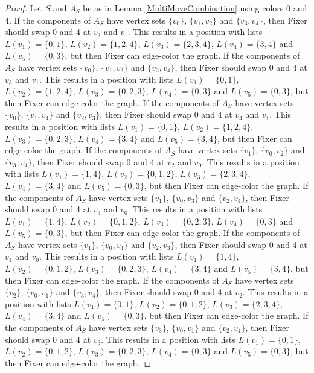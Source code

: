 \documentclass[12pt]{amsart}
\theoremstyle{plain}
\theoremstyle{definition}
\theoremstyle{remark}
\begin{document}
\begin{proof}
Let $S$ and $A_S$ be as in Lemma \ref{MultiMoveCombination} using colors $0$ and $4$. If the components of $A_S$ have vertex sets $\{v_0\}$, $\{v_1, v_2\}$ and $\{v_3, v_4\}$, then Fixer should swap 0 and 4 at $v_2$ and $v_1$. This results in a position with lists $L(v_1) = \{0, 1\}$, $L(v_2) = \{1, 2, 4\}$, $L(v_3) = \{2, 3, 4\}$, $L(v_4) = \{3, 4\}$ and $L(v_5) = \{0, 3\}$, but then Fixer can edge-color the graph.
If the components of $A_S$ have vertex sets $\{v_0\}$, $\{v_1, v_3\}$ and $\{v_2, v_4\}$, then Fixer should swap 0 and 4 at $v_3$ and $v_1$. This results in a position with lists $L(v_1) = \{0, 1\}$, $L(v_2) = \{1, 2, 4\}$, $L(v_3) = \{0, 2, 3\}$, $L(v_4) = \{0, 3\}$ and $L(v_5) = \{0, 3\}$, but then Fixer can edge-color the graph.
If the components of $A_S$ have vertex sets $\{v_0\}$, $\{v_1, v_4\}$ and $\{v_2, v_3\}$, then Fixer should swap 0 and 4 at $v_4$ and $v_1$. This results in a position with lists $L(v_1) = \{0, 1\}$, $L(v_2) = \{1, 2, 4\}$, $L(v_3) = \{0, 2, 3\}$, $L(v_4) = \{3, 4\}$ and $L(v_5) = \{3, 4\}$, but then Fixer can edge-color the graph.
If the components of $A_S$ have vertex sets $\{v_1\}$, $\{v_0, v_2\}$ and $\{v_3, v_4\}$, then Fixer should swap 0 and 4 at $v_2$ and $v_0$. This results in a position with lists $L(v_1) = \{1, 4\}$, $L(v_2) = \{0, 1, 2\}$, $L(v_3) = \{2, 3, 4\}$, $L(v_4) = \{3, 4\}$ and $L(v_5) = \{0, 3\}$, but then Fixer can edge-color the graph.
If the components of $A_S$ have vertex sets $\{v_1\}$, $\{v_0, v_3\}$ and $\{v_2, v_4\}$, then Fixer should swap 0 and 4 at $v_3$ and $v_0$. This results in a position with lists $L(v_1) = \{1, 4\}$, $L(v_2) = \{0, 1, 2\}$, $L(v_3) = \{0, 2, 3\}$, $L(v_4) = \{0, 3\}$ and $L(v_5) = \{0, 3\}$, but then Fixer can edge-color the graph.
If the components of $A_S$ have vertex sets $\{v_1\}$, $\{v_0, v_4\}$ and $\{v_2, v_3\}$, then Fixer should swap 0 and 4 at $v_4$ and $v_0$. This results in a position with lists $L(v_1) = \{1, 4\}$, $L(v_2) = \{0, 1, 2\}$, $L(v_3) = \{0, 2, 3\}$, $L(v_4) = \{3, 4\}$ and $L(v_5) = \{3, 4\}$, but then Fixer can edge-color the graph.
If the components of $A_S$ have vertex sets $\{v_2\}$, $\{v_0, v_1\}$ and $\{v_3, v_4\}$, then Fixer should swap 0 and 4 at $v_2$. This results in a position with lists $L(v_1) = \{0, 1\}$, $L(v_2) = \{0, 1, 2\}$, $L(v_3) = \{2, 3, 4\}$, $L(v_4) = \{3, 4\}$ and $L(v_5) = \{0, 3\}$, but then Fixer can edge-color the graph.
If the components of $A_S$ have vertex sets $\{v_3\}$, $\{v_0, v_1\}$ and $\{v_2, v_4\}$, then Fixer should swap 0 and 4 at $v_3$. This results in a position with lists $L(v_1) = \{0, 1\}$, $L(v_2) = \{0, 1, 2\}$, $L(v_3) = \{0, 2, 3\}$, $L(v_4) = \{0, 3\}$ and $L(v_5) = \{0, 3\}$, but then Fixer can edge-color the graph.

\end{proof}
\end{document}
